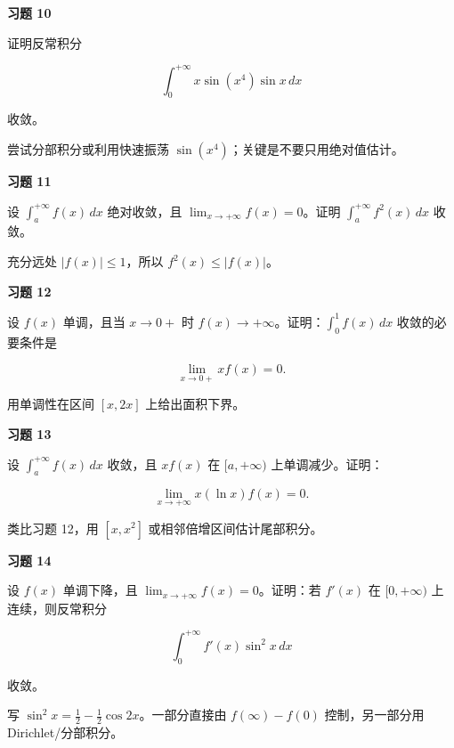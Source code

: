 \begin{exercisebox}
\textbf{习题 10 }

证明反常积分

\[
        \int_0^{+\infty}x\sin(x^4)\sin x\,dx
      \]

收敛。

\begin{hintbox}
尝试分部积分或利用快速振荡 \(\sin(x^4)\)；关键是不要只用绝对值估计。
\end{hintbox}
\end{exercisebox}

\begin{exercisebox}
\textbf{习题 11 }

设 \(\int_a^{+\infty}f(x)\,dx\) 绝对收敛，且 \(\lim_{x\to+\infty}f(x)=0\)。证明 \(\int_a^{+\infty}f^2(x)\,dx\) 收敛。

\begin{hintbox}
充分远处 \(|f(x)|\le1\)，所以 \(f^2(x)\le |f(x)|\)。
\end{hintbox}
\end{exercisebox}

\begin{exercisebox}
\textbf{习题 12 }

设 \(f(x)\) 单调，且当 \(x\to0+\) 时 \(f(x)\to+\infty\)。证明：\(\int_0^1f(x)\,dx\) 收敛的必要条件是

\[
        \lim_{x\to0+}x f(x)=0.
      \]

\begin{hintbox}
用单调性在区间 \([x,2x]\) 上给出面积下界。
\end{hintbox}
\end{exercisebox}

\begin{exercisebox}
\textbf{习题 13 }

设 \(\int_a^{+\infty}f(x)\,dx\) 收敛，且 \(xf(x)\) 在 \([a,+\infty)\) 上单调减少。证明：

\[
        \lim_{x\to+\infty}x(\ln x)f(x)=0.
      \]

\begin{hintbox}
类比习题 12，用 \([x,x^2]\) 或相邻倍增区间估计尾部积分。
\end{hintbox}
\end{exercisebox}

\begin{exercisebox}
\textbf{习题 14 }

设 \(f(x)\) 单调下降，且 \(\lim_{x\to+\infty}f(x)=0\)。证明：若 \(f'(x)\) 在 \([0,+\infty)\) 上连续，则反常积分

\[
        \int_0^{+\infty}f'(x)\sin^2x\,dx
      \]

收敛。

\begin{hintbox}
写 \(\sin^2x=\frac12-\frac12\cos2x\)。一部分直接由 \(f(\infty)-f(0)\) 控制，另一部分用 Dirichlet/分部积分。
\end{hintbox}
\end{exercisebox}

